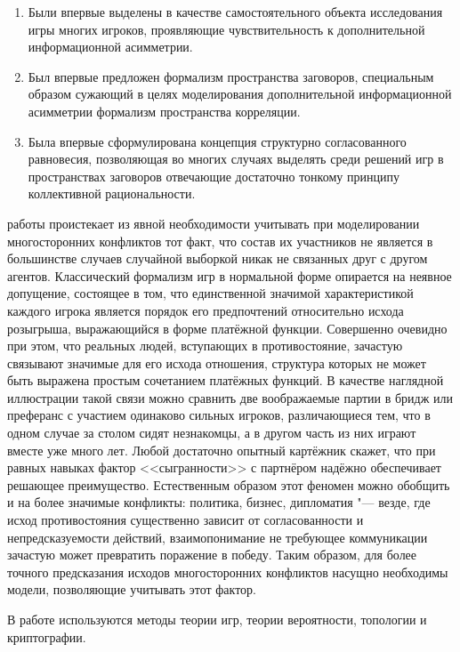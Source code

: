 {\novelty}
\begin{enumerate}[beginpenalty=10000] %
  \item Были впервые выделены в качестве самостоятельного объекта исследования игры многих игроков, проявляющие чувствительность к дополнительной информационной асимметрии.
  \item Был впервые предложен формализм пространства заговоров, специальным образом сужающий в целях моделирования дополнительной информационной асимметрии формализм пространства корреляции.
  \item Была впервые сформулирована концепция структурно согласованного равновесия, позволяющая во многих случаях выделять среди решений игр в пространствах заговоров отвечающие достаточно тонкому принципу коллективной рациональности.
\end{enumerate}

{\influence} работы проистекает из явной необходимости учитывать при моделировании многосторонних конфликтов тот факт, что состав их участников не является в большинстве случаев случайной выборкой никак не связанных друг с другом агентов. Классический формализм игр в нормальной форме опирается на неявное допущение, состоящее в том, что единственной значимой характеристикой каждого игрока является порядок его предпочтений относительно исхода розыгрыша, выражающийся в форме платёжной функции. Совершенно очевидно при этом, что реальных людей, вступающих в противостояние, зачастую связывают значимые для его исхода отношения, структура которых не может быть выражена простым сочетанием платёжных функций. В качестве наглядной иллюстрации такой связи можно сравнить две воображаемые партии в бридж или преферанс с участием одинаково сильных игроков, различающиеся тем, что в одном случае за столом сидят незнакомцы, а в другом часть из них играют вместе уже много лет. Любой достаточно опытный картёжник скажет, что при равных навыках фактор <<сыгранности>> с партнёром надёжно обеспечивает решающее преимущество. Естественным образом этот феномен можно обобщить и на более значимые конфликты: политика, бизнес, дипломатия "--- везде, где исход противостояния существенно зависит от согласованности и непредсказуемости действий, взаимопонимание не требующее коммуникации зачастую может превратить поражение в победу. Таким образом, для более точного предсказания исходов многосторонних конфликтов насущно необходимы модели, позволяющие учитывать этот фактор.

{\methods} В работе используются методы теории игр, теории вероятности, топологии и криптографии.

